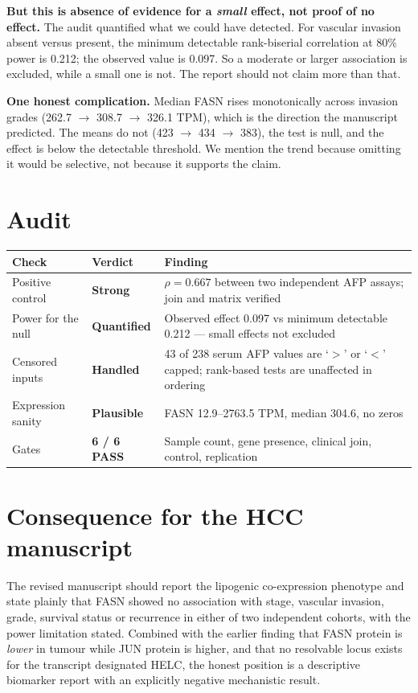\documentclass[11pt,a4paper]{article}
\begin{document}
\textbf{But this is absence of evidence for a \emph{small} effect, not proof of no effect.}
The audit quantified what we could have detected. For vascular invasion absent versus
present, the minimum detectable rank-biserial correlation at 80\% power is 0.212; the
observed value is 0.097. So a moderate or larger association is excluded, while a small one
is not. The report should not claim more than that.

\textbf{One honest complication.} Median FASN rises monotonically across invasion grades
(262.7 $\to$ 308.7 $\to$ 326.1 TPM), which is the direction the manuscript predicted. The
means do not (423 $\to$ 434 $\to$ 383), the test is null, and the effect is below the
detectable threshold. We mention the trend because omitting it would be selective, not
because it supports the claim.

\section{Audit}

\begin{center}
\begin{tabular}{@{}llp{7.6cm}@{}}
\toprule
\textbf{Check} & \textbf{Verdict} & \textbf{Finding} \\
\midrule
Positive control & \textbf{Strong} & $\rho=0.667$ between two independent AFP assays; join and matrix verified \\
Power for the null & \textbf{Quantified} & Observed effect 0.097 vs minimum detectable 0.212 --- small effects not excluded \\
Censored inputs & \textbf{Handled} & 43 of 238 serum AFP values are `$>$' or `$<$' capped; rank-based tests are unaffected in ordering \\
Expression sanity & \textbf{Plausible} & FASN 12.9--2763.5 TPM, median 304.6, no zeros \\
Gates & \textbf{6 / 6 PASS} & Sample count, gene presence, clinical join, control, replication \\
\bottomrule
\end{tabular}
\end{center}

\section{Consequence for the HCC manuscript}

The revised manuscript should report the lipogenic co-expression phenotype and state
plainly that FASN showed no association with stage, vascular invasion, grade, survival
status or recurrence in either of two independent cohorts, with the power limitation
stated. Combined with the earlier finding that FASN protein is \emph{lower} in tumour while
JUN protein is higher, and that no resolvable locus exists for the transcript designated
HELC, the honest position is a descriptive biomarker report with an explicitly negative
mechanistic result.
\end{document}
